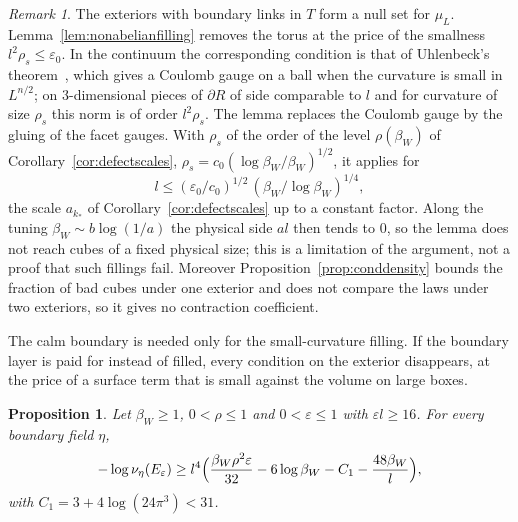 \documentclass[11pt]{amsart}
\newtheorem{proposition}[theorem]{Proposition}
\theoremstyle{definition}
\theoremstyle{remark}
\newtheorem{remark}[theorem]{Remark}
\numberwithin{equation}{section}
\begin{document}
\begin{remark}\label{rem:boxnonabelian}
The exteriors with boundary links in $T$ form a null set for $\mu_L$.
Lemma~\ref{lem:nonabelianfilling} removes the torus at the price of the
smallness $l^2\rho_s\le\varepsilon_0$. In the continuum the corresponding
condition is that of Uhlenbeck's theorem~\cite{Uhl82}, which gives a
Coulomb gauge on a ball when the curvature is small in $L^{n/2}$; on
$3$-dimensional pieces of $\partial R$ of side comparable to $l$ and for
curvature of size $\rho_s$ this norm is of order $l^2\rho_s$. The lemma
replaces the Coulomb gauge by the gluing of the facet gauges. With
$\rho_s$ of the order of the level $\rho(\beta_W)$ of
Corollary~\ref{cor:defectscales}, $\rho_s=c_0(\log\beta_W/\beta_W)^{1/2}$,
it applies for
\[
l\le(\varepsilon_0/c_0)^{1/2}\,(\beta_W/\log\beta_W)^{1/4},
\]
the scale $a_{k_*}$ of Corollary~\ref{cor:defectscales} up to a constant
factor. Along the tuning $\beta_W\sim b\log(1/a)$ the physical side $al$
then tends to $0$, so the lemma does not reach cubes of a fixed physical
size; this is a limitation of the argument, not a proof that such fillings
fail. Moreover Proposition~\ref{prop:conddensity} bounds the fraction of
bad cubes under one exterior and does not compare the laws under two
exteriors, so it gives no contraction coefficient.
\end{remark}

The calm boundary is needed only for the small-curvature filling. If the
boundary layer is paid for instead of filled, every condition on the
exterior disappears, at the price of a surface term that is small against
the volume on large boxes.

\begin{proposition}\label{prop:anyexterior}
Let $\beta_W\ge1$, $0<\rho\le1$ and $0<\varepsilon\le1$ with $\varepsilon
l\ge16$. For every boundary field $\eta$,
\[
-\log\nu_\eta(E_\varepsilon)\ge l^4\Bigl(\frac{\beta_W\rho^2\varepsilon}{32}
-6\log\beta_W-C_1-\frac{48\beta_W}{l}\Bigr),
\]
with $C_1=3+4\log(24\pi^3)<31$.
\end{proposition}
\end{document}
